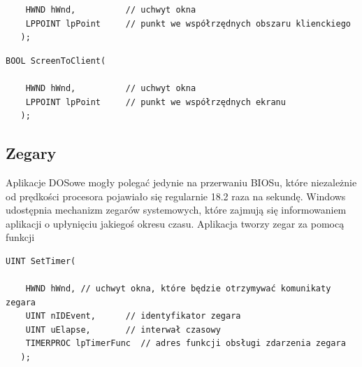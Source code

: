 \begin{itemize}
\begin{scriptsize}
\begin{verbatim}
    HWND hWnd,          // uchwyt okna 
    LPPOINT lpPoint     // punkt we współrzędnych obszaru klienckiego
   );
\end{verbatim}
\end{scriptsize}

\begin{scriptsize}
\begin{verbatim}
BOOL ScreenToClient(

    HWND hWnd,          // uchwyt okna 
    LPPOINT lpPoint     // punkt we współrzędnych ekranu
   );
\end{verbatim}
\end{scriptsize}

\end{itemize}

\subsection{Zegary}
\label{subsubsection_zegary}

Aplikacje DOSowe mogły polegać jedynie na przerwaniu BIOSu, które niezależnie od prędkości procesora 
pojawiało się regularnie 18.2 raza na sekundę. Windows udostępnia mechanizm zegarów systemowych, które zajmują się 
informowaniem aplikacji o upłynięciu jakiegoś okresu czasu. Aplikacja tworzy zegar za pomocą funkcji 

\begin{scriptsize}
\begin{verbatim}
UINT SetTimer(

    HWND hWnd, // uchwyt okna, które będzie otrzymywać komunikaty zegara
    UINT nIDEvent,      // identyfikator zegara
    UINT uElapse,       // interwał czasowy
    TIMERPROC lpTimerFunc  // adres funkcji obsługi zdarzenia zegara
   );	
\end{verbatim}
\end{scriptsize}

